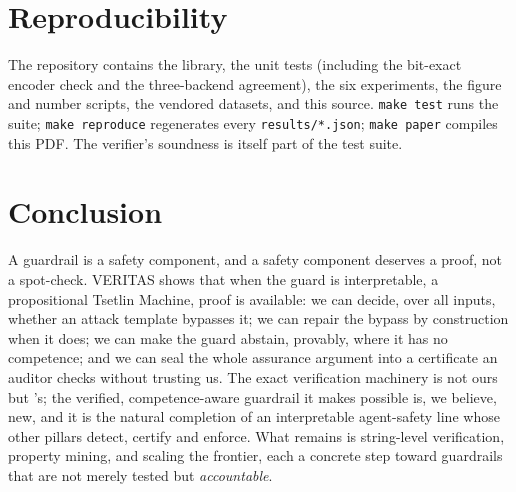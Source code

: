 \documentclass[11pt]{article}
\begin{document}
\section{Reproducibility}
The repository contains the library, the unit tests (including the bit-exact
encoder check and the three-backend agreement), the six experiments, the figure and
number scripts, the vendored datasets, and this source. \texttt{make test} runs the
suite; \texttt{make reproduce} regenerates every \texttt{results/*.json};
\texttt{make paper} compiles this PDF. The verifier's soundness is itself part of
the test suite.

\section{Conclusion}
A guardrail is a safety component, and a safety component deserves a proof, not a
spot-check. VERITAS shows that when the guard is interpretable, a propositional
Tsetlin Machine, proof is available: we can decide, over all inputs, whether an
attack template bypasses it; we can repair the bypass by construction when it does;
we can make the guard abstain, provably, where it has no competence; and we can seal
the whole assurance argument into a certificate an auditor checks without trusting
us. The exact verification machinery is not ours but
\citeauthor{przybysz2023verifying}'s; the verified, competence-aware guardrail
it makes possible is, we believe, new, and it is the natural completion of an
interpretable agent-safety line whose other pillars detect, certify and enforce.
What remains is string-level verification, property mining, and scaling the
frontier, each a concrete step toward guardrails that are not merely tested but
\emph{accountable}.


\end{document}
